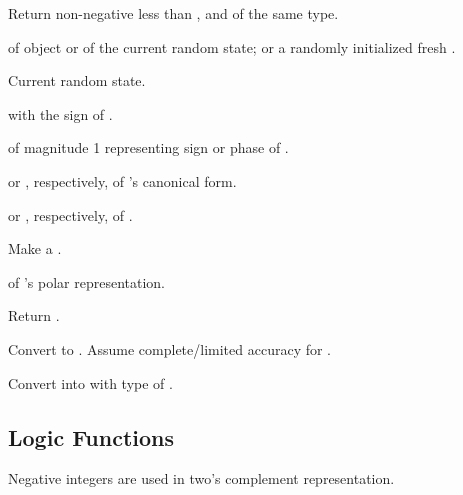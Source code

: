 \begin{LIST}{1cm}
  {
    Return non-negative  less than ,
    and of the same type. 
  }

  {
     of  object  or of
    the current random state; or a randomly initialized fresh . 
  }

  {
  Current random state.
  }

  {
   with the sign of .
  }

  { of magnitude 1
  representing sign or phase of .
  }

  {
   or , respectively, of
  's canonical form.
  }

  {
   or , respectively, of .
  }

  {Make a .
    }

  { of 's polar representation.
    }

  {
    Return .
  }

  {
  Convert  to . Assume complete/limited accuracy for .
  }

  {
  Convert  into  with type of .
  }

\end{LIST}


\subsection{Logic Functions} 
\label{section:Logic Functions}
Negative integers are used in
two's complement representation.

